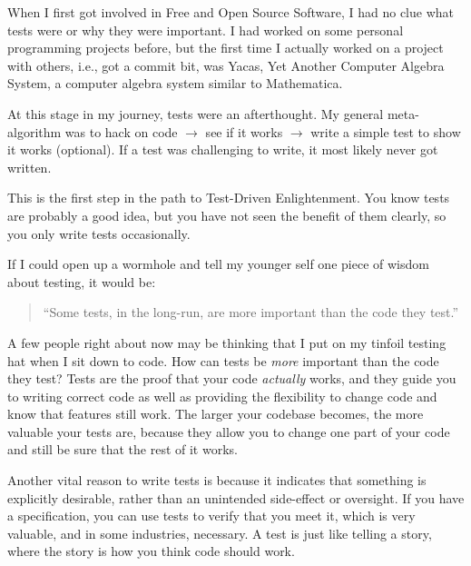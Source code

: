 

When I first got involved in Free and Open Source Software, I had no clue what
tests were or why they were important. I had worked on some personal programming
projects before, but the first time I actually worked on a project with others,
i.e., got a commit bit, was Yacas, Yet Another Computer Algebra System, a computer algebra system similar to Mathematica.

At this stage in my journey, tests were an afterthought. My general
meta-algorithm was to hack on code $\rightarrow$ see if it works $\rightarrow$
write a simple test to show it works (optional). If a test was challenging to
write, it most likely never got written.

This is the first step in the path to Test-Driven Enlightenment. You know tests
are probably a good idea, but you have not seen the benefit of them clearly, so
you only write tests occasionally.

If I could open up a wormhole and tell my younger self one piece of wisdom about
testing, it would be:
\begin{quote}``Some tests, in the long-run, are more important than the code
they test.''\end{quote}

A few people right about now may be thinking that I put on my tinfoil testing
hat when I sit down to code. How can tests be \emph{more} important than the
code they test? Tests are the proof that your code \emph{actually} works, and
they guide you to writing correct code as well as providing the flexibility to
change code and know that features still work. The larger your codebase becomes,
the more valuable your tests are, because they allow you to change one part of
your code and still be sure that the rest of it works.

Another vital reason to write tests is because it indicates that something is
explicitly desirable, rather than an unintended side-effect or oversight. If you
have a specification, you can use tests to verify that you meet it, which is
very valuable, and in some industries, necessary. A test is just like telling a
story, where the story is how you think code should work.

